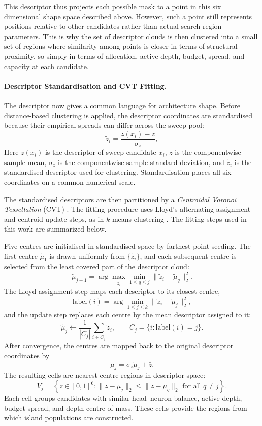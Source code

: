 This descriptor thus projects each possible mask to a point in this six dimensional shape space described above. However, such a point still represents positions relative to other candidates rather than actual search region parameters. This is why the set of descriptor clouds is then clustered into a small set of regions where similarity among points is closer in terms of structural proximity, so simply in terms of allocation, active depth, budget, spread, and capacity at each candidate.

\paragraph{Descriptor Standardisation and CVT Fitting.}
The descriptor now gives a common language for architecture shape. Before distance-based clustering is applied, the descriptor coordinates are standardised because their empirical spreads can differ across the sweep pool:
\[
\tilde z_i=\frac{z(x_i)-\bar z}{\sigma_z},
\]
Here $z(x_i)$ is the descriptor of sweep candidate $x_i$, $\bar z$ is the componentwise sample mean, $\sigma_z$ is the componentwise sample standard deviation, and $\tilde z_i$ is the standardised descriptor used for clustering. Standardisation places all six coordinates on a common numerical scale.

The standardised descriptors are then partitioned by a \emph{Centroidal Voronoi Tessellation} (CVT) \citep{du1999centroidal}. The fitting procedure uses Lloyd's alternating assignment and centroid-update steps, as in $k$-means clustering \citep{lloyd1982least,macqueen1967classification}. The fitting steps used in this work are summarized below.

Five centres are initialised in standardised space by farthest-point seeding. The first centre $\tilde\mu_1$ is drawn uniformly from $\{\tilde z_i\}$, and each subsequent centre is selected from the least covered part of the descriptor cloud:
\[
\tilde\mu_{j+1}
=
\arg\max_{\tilde z_i}
\min_{1\le q\le j}
\|\tilde z_i-\tilde\mu_q\|_2^2 .
\]
The Lloyd assignment step maps each descriptor to its closest centre,
\[
\mathrm{label}(i)
=
\arg\min_{1\le j\le k}
\|\tilde z_i-\tilde\mu_j\|_2^2,
\]
and the update step replaces each centre by the mean descriptor assigned to it:
\[
\tilde\mu_j
\leftarrow
\frac{1}{|C_j|}
\sum_{i\in C_j}\tilde z_i,
\qquad
C_j=\{i:\mathrm{label}(i)=j\}.
\]
After convergence, the centres are mapped back to the original descriptor coordinates by
\[
\mu_j=\sigma_z\tilde\mu_j+\bar z.
\]
The resulting cells are nearest-centre regions in descriptor space:
\[
V_j
=
\left\{
z\in[0,1]^6:
\|z-\mu_j\|_2
\le
\|z-\mu_q\|_2
\text{ for all }q\ne j
\right\}.
\]
Each cell groups candidates with similar head--neuron balance, active depth, budget spread, and depth centre of mass. These cells provide the regions from which island populations are constructed.

